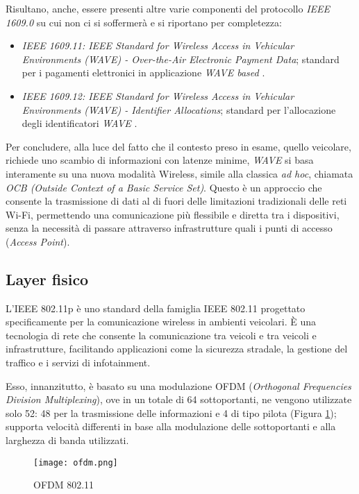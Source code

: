 Risultano, anche, essere presenti altre varie componenti del protocollo \textit{IEEE 1609.0} su cui non ci si soffermerà e si riportano per completezza:

\begin{itemize}
    \item \textit{IEEE 1609.11:  IEEE Standard for Wireless Access in Vehicular Environments (WAVE) - Over-the-Air Electronic Payment Data}; standard per i pagamenti elettronici in applicazione \textit{WAVE based} \cite{5692959}.
    \item \textit{IEEE 1609.12:  IEEE Standard for Wireless Access in Vehicular Environments (WAVE) - Identifier Allocations}; standard per l'allocazione degli identificatori \textit{WAVE} \cite{8877516}.
\end{itemize}

Per concludere, alla luce del fatto che il contesto preso in esame, quello veicolare, richiede uno scambio di informazioni con latenze minime, \textit{WAVE} si basa interamente su una nuova modalità Wireless, simile alla classica \textit{ad hoc}, chiamata \textit{OCB (Outside Context of a Basic Service Set)}. Questo è un approccio che consente la trasmissione di dati al di fuori delle limitazioni tradizionali delle reti Wi-Fi, permettendo una comunicazione più flessibile e diretta tra i dispositivi, senza la necessità di passare attraverso infrastrutture quali i punti di accesso (\textit{Access Point}).

\subsection[Layer fisico]{Layer fisico}
L'IEEE 802.11p è uno standard della famiglia IEEE 802.11 progettato specificamente per la comunicazione wireless in ambienti veicolari. È una tecnologia di rete che consente la comunicazione tra veicoli e tra veicoli e infrastrutture, facilitando applicazioni come la sicurezza stradale, la gestione del traffico e i servizi di infotainment.

Esso, innanzitutto, è basato su una modulazione OFDM (\textit{Orthogonal Frequencies Division Multiplexing}), ove in un totale di 64 sottoportanti, ne vengono utilizzate solo 52: 48 per la trasmissione delle informazioni e 4 di tipo pilota (Figura \ref{fig:ofdm}); supporta velocità differenti in base alla modulazione delle sottoportanti e alla larghezza di banda utilizzati.

\begin{figure}[h!]
    \centering
    \texttt{[image: ofdm.png]}
    \caption{OFDM 802.11}
    \label{fig:ofdm}
\end{figure}

